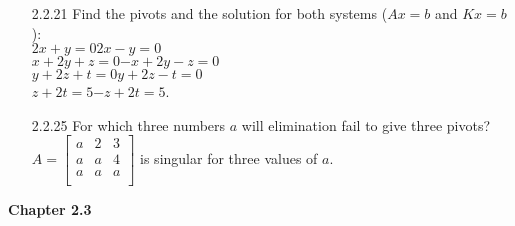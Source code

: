 \documentclass[10pt,twoside,reqno]{article}
\begin{document}
\begin{enumerate}
\vspace{3mm}
\item[2.2.21]Find the pivots and the solution for both systems ($Ax = b$ and $Kx = b$): \\
\hspace{122pt}$2x+ y      =0$\hspace{60pt}$2x- y      =0$\\
\hspace{105pt}$ x+2y+ z   =0$\hspace{35pt}$-x+2y- z   =0$\\
\hspace{107pt}$    y+2z+ t=0$\hspace{46pt}$    y+2z- t=0$\\
\hspace{125pt}$       z+2t=5$\hspace{55pt}$     - z+2t=5$.\\
\vspace{3mm}
\item[2.2.25]For which three numbers $a$ will elimination fail to give three pivots? \\
\vspace{3mm}
\hspace{95pt}
$
$$
A=
\begin{bmatrix}
a&2&3\\
a&a&4\\
a&a&a\\
\end{bmatrix}
$$
$
is singular for three values of $a$.
\vspace{3mm}
\end{enumerate}
\vspace{5mm}
\textbf{Chapter 2.3}
\end{document}
